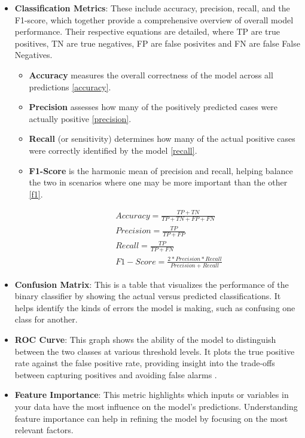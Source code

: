 \documentclass[3p,times,procedia]{elsarticle}
\begin{document}
\begin{itemize}
    \item \textbf{Classification Metrics}: These include accuracy, precision, recall, and the F1-score, which together provide a comprehensive overview of overall model performance. Their respective equations are detailed, where TP are true positives, TN are true negatives, FP are false posivites and FN are false False Negatives.
    \begin{itemize}
        \item \textbf{Accuracy} measures the overall correctness of the model across all predictions \ref{accuracy}. 
        \item \textbf{Precision} assesses how many of the positively predicted cases were actually positive \ref{precision}.
        \item \textbf{Recall} (or sensitivity) determines how many of the actual positive cases were correctly identified by the model \ref{recall}.
        \item \textbf{F1-Score} is the harmonic mean of precision and recall, helping balance the two in scenarios where one may be more important than the other \ref{f1}.
        
        \begin{align} 
            &\mathit{Accuracy} = \frac{TP+TN}{TP+TN+FP+FN} \label{accuracy}\\
            &\mathit{Precision} = \frac{TP}{TP+FP} \label{precision}\\
            &\mathit{Recall} = \frac{TP}{TP+FN} \label{recall}\\
            &F1-Score = \frac{2*\mathit{Precision}*\mathit{Recall}}{\mathit{Precision}+\mathit{Recall} \label{f1}}
        \end{align}
    \end{itemize}
    \item \textbf{Confusion Matrix}: This is a table that visualizes the performance of the binary classifier by showing the actual versus predicted classifications. It helps identify the kinds of errors the model is making, such as confusing one class for another.
    \item \textbf{ROC Curve}: This graph shows the ability of the model to distinguish between the two classes at various threshold levels. It plots the true positive rate against the false positive rate, providing insight into the trade-offs between capturing positives and avoiding false alarms \cite{hoo2017roc}.
    \item \textbf{Feature Importance}: This metric highlights which inputs or variables in your data have the most influence on the model’s predictions. Understanding feature importance can help in refining the model by focusing on the most relevant factors.
\end{itemize}
\end{document}
